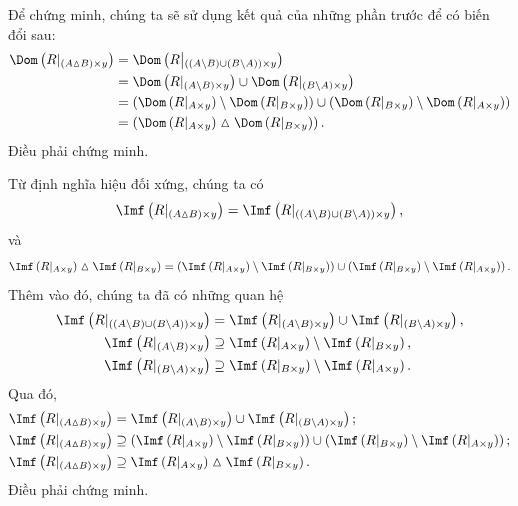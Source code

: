 \stepSubexercise Để chứng minh, chúng ta sẽ sử dụng kết quả của những phần trước để có biến đổi sau:
\begin{align*}
   \Dom\left(R|_{(A \vartriangle B) \times y}\right) &= \Dom\left(R\middle|_{((A \setminus B) \cup (B \setminus A)) \times y}\right) \\
   &= \Dom\left(R|_{(A \setminus B) \times y}\right) \cup \Dom\left(R|_{(B \setminus A) \times y}\right) \\
   &= \left(\Dom\left(R|_{A \times y}\right) \setminus \Dom\left(R|_{B \times y}\right)\right) \cup \left(\Dom\left(R|_{B \times y}\right) \setminus \Dom\left(R|_{A \times y}\right)\right) \\
   &= \left(\Dom\left(R|_{A \times y}\right) \vartriangle \Dom\left(R|_{B \times y}\right)\right).
\end{align*}
Điều phải chứng minh.

\stepSubexercise Từ định nghĩa hiệu đối xứng, chúng ta có \begin{equation*}
   \Imf\left(R|_{(A \vartriangle B) \times y}\right) = \Imf\left(R|_{((A \setminus B) \cup (B \setminus A)) \times y}\right),\end{equation*} 
   và 
   $$\Imf\left(R|_{A \times y}\right) \vartriangle \Imf\left(R|_{B \times y}\right) = \left( \Imf\left(R|_{A \times y}\right) \setminus \Imf\left(R|_{B \times y}\right)\right) \cup \left( \Imf\left(R|_{B \times y}\right) \setminus \Imf\left(R|_{A \times y}\right)\right).$$
Thêm vào đó, chúng ta đã có những quan hệ 
\begin{align*}
   \Imf\left(R|_{((A \setminus B) \cup (B \setminus A)) \times y}\right) &= \Imf\left(R|_{(A \setminus B) \times y}\right) \cup \Imf\left(R|_{(B \setminus A) \times y}\right), \\
   \Imf\left(R|_{(A \setminus B) \times y}\right) &\supseteq \Imf\left(R|_{A \times y}\right) \setminus \Imf\left(R|_{B \times y}\right), \\
   \Imf\left(R|_{(B \setminus A) \times y}\right) &\supseteq \Imf\left(R|_{B \times y}\right) \setminus \Imf\left(R|_{A \times y}\right).
\end{align*}
Qua đó, \begin{align*}
   \Imf\left(R|_{(A \vartriangle B) \times y}\right) &= \Imf\left(R|_{(A \setminus B) \times y}\right) \cup \Imf\left(R|_{(B \setminus A) \times y}\right); \\
   \Imf\left(R|_{(A \vartriangle B) \times y}\right) &\supseteq \left( \Imf\left(R|_{A \times y}\right) \setminus \Imf\left(R|_{B \times y}\right)\right) \cup \left( \Imf\left(R|_{B \times y}\right) \setminus \Imf\left(R|_{A \times y}\right)\right); \\
   \Imf\left(R|_{(A \vartriangle B) \times y}\right) &\supseteq \Imf\left(R|_{A \times y}\right) \vartriangle \Imf\left(R|_{B \times y}\right).
\end{align*}
Điều phải chứng minh.

